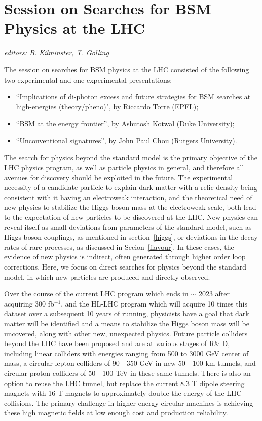\section{Session on Searches for BSM Physics at the LHC}\label{lhcbsm}{\it editors: B. Kilminster, T. Golling}

\noindent The session on searches for BSM physics at the LHC consisted of the following two experimental and one experimental presentations:
\begin{itemize} \setlength{\itemsep}{-1ex}
\item ``Implications of di-photon excess and future strategies for BSM searches at high-energies (theory/pheno)", by Riccardo Torre  (EPFL);
\item ``BSM at the energy frontier'', by Ashutosh Kotwal  (Duke University);
\item ``Unconventional signatures'', by John Paul Chou (Rutgers University).
\end{itemize}


\noindent The search for physics beyond the standard model is the primary objective of the LHC physics program, as well as particle physics in general, and therefore all avenues for discovery should be exploited in the future.  The experimental necessity of a candidate particle to explain dark matter with a relic density being consistent with it having an electroweak interaction, and the theoretical need of new physics to stabilize the Higgs boson mass at the electroweak scale, both lead to the expectation of new particles to be discovered at the LHC.    New physics can reveal itself as small deviations from parameters of the standard model, such as Higgs boson couplings, as mentioned in section~\ref{higgs}, or deviations in the decay rates of rare processes, as discussed in Secion~\ref{flavour}.  In these cases, the evidence of new physics is indirect, often generated through higher order loop corrections.   Here, we focus on direct searches for physics beyond the standard model, in which new particles are produced and directly observed.

\medskip 
\noindent Over the course of the current LHC program which ends in $\sim$ 2023 after acquiring 300 fb$^{-1}$, and the HL-LHC program which will acquire 10 times this dataset over a subsequent 10 years of running, physicists have a goal that dark matter will be identified and a means to stabilize the Higgs boson mass will be uncovered, along with other new, unexpected physics.  Future particle colliders beyond the LHC have been proposed and are at various stages of R\& D, including linear colliders with energies ranging from 500 to 3000 GeV center of mass, a circular lepton colliders of 90 - 350 GeV in new 50 - 100 km tunnels, and circular proton colliders of 50 - 100 TeV in these same tunnels.  There is also an option to reuse the LHC tunnel, but replace the current 8.3 T dipole steering magnets with 16 T magnets to approximately double the energy of the LHC collisions.   The primary challenge in higher energy circular machines is achieving these high magnetic fields at low enough cost and production reliability. 
\medskip 

